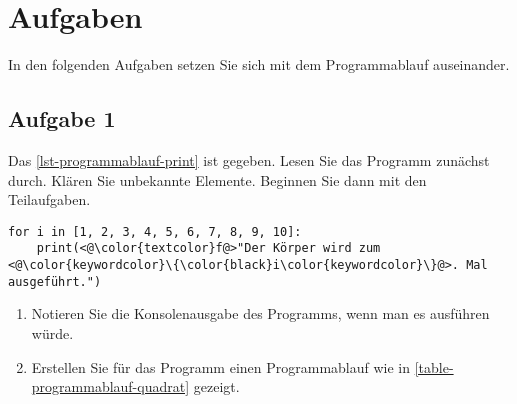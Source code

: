 \section{Aufgaben}

In den folgenden Aufgaben setzen Sie sich mit dem Programmablauf auseinander.

\subsection{Aufgabe 1}

Das \autoref{lst-programmablauf-print} ist gegeben. Lesen Sie das Programm zunächst durch. Klären Sie unbekannte Elemente.  Beginnen Sie dann mit den Teilaufgaben.

\begin{lstlisting}[caption={Das Programm erzeugt eine Ausgabe in der Konsole.}, label={lst-programmablauf-print}]
for i in [1, 2, 3, 4, 5, 6, 7, 8, 9, 10]:
    print(<@\color{textcolor}f@>"Der Körper wird zum <@\color{keywordcolor}\{\color{black}i\color{keywordcolor}\}@>. Mal ausgeführt.")
\end{lstlisting}

\begin{enumerate}
\item Notieren Sie die Konsolenausgabe des Programms, wenn man es ausführen würde.

\fillwithgrid{2.5in}

\item Erstellen Sie für das Programm einen Programmablauf wie in \autoref{table-programmablauf-quadrat} gezeigt.

\end{enumerate}

